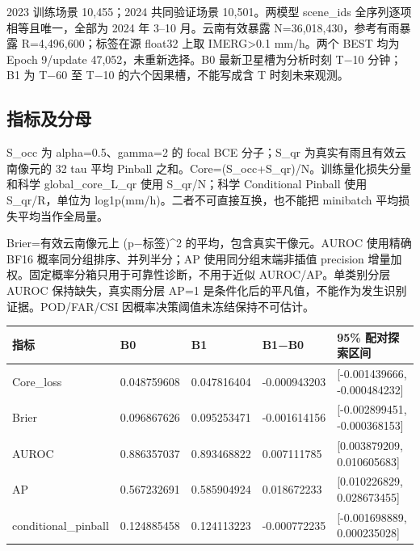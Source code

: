 \documentclass[UTF8,a4paper,10pt,fontset=fandol]{ctexart}
\begin{document}
2023 训练场景 10,455；2024 共同验证场景 10,501。两模型 scene\_\allowbreak{}ids 全序列逐项相等且唯一，全部为 2024 年 3–10 月。云南有效暴露 N=36,018,430，参考有雨暴露 R=4,496,600；标签在源 float32 上取 IMERG>0.1 mm/h。两个 BEST 均为 Epoch 9/update 47,052，未重新选择。B0 最新卫星槽为分析时刻 T−10 分钟；B1 为 T−60 至 T−10 的六个因果槽，不能写成含 T 时刻未来观测。\par

\subsection*{指标及分母}

S\_\allowbreak{}occ 为 alpha=0.5、gamma=2 的 focal BCE 分子；S\_\allowbreak{}qr 为真实有雨且有效云南像元的 32 tau 平均 Pinball 之和。Core=(S\_\allowbreak{}occ+S\_\allowbreak{}qr)/N。训练量化损失分量和科学 global\_\allowbreak{}core\_\allowbreak{}L\_\allowbreak{}qr 使用 S\_\allowbreak{}qr/N；科学 Conditional Pinball 使用 S\_\allowbreak{}qr/R，单位为 log1p(mm/h)。二者不可直接互换，也不能把 minibatch 平均损失平均当作全局量。\par

Brier=有效云南像元上 (p−标签)\textasciicircum{}2 的平均，包含真实干像元。AUROC 使用精确 BF16 概率同分组排序、并列半分；AP 使用同分组末端非插值 precision 增量加权。固定概率分箱只用于可靠性诊断，不用于近似 AUROC/AP。单类别分层 AUROC 保持缺失，真实雨分层 AP=1 是条件化后的平凡值，不能作为发生识别证据。POD/FAR/CSI 因概率决策阈值未冻结保持不可估计。\par

\begin{center}\scriptsize\begin{longtable}{@{}p{\dimexpr(\linewidth-8\tabcolsep)/5\relax}p{\dimexpr(\linewidth-8\tabcolsep)/5\relax}p{\dimexpr(\linewidth-8\tabcolsep)/5\relax}p{\dimexpr(\linewidth-8\tabcolsep)/5\relax}p{\dimexpr(\linewidth-8\tabcolsep)/5\relax}@{}}\toprule
指标 & B0 & B1 & B1−B0 & 95\% 配对探索区间\\
\midrule\endhead
Core\_\allowbreak{}loss & 0.048759608 & 0.047816404 & -0.000943203 & [-0.001439666, -0.000484232]\\
Brier & 0.096867626 & 0.095253471 & -0.001614156 & [-0.002899451, -0.000368153]\\
AUROC & 0.886357037 & 0.893468822 & 0.007111785 & [0.003879209, 0.010605683]\\
AP & 0.567232691 & 0.585904924 & 0.018672233 & [0.010226829, 0.028673455]\\
conditional\_\allowbreak{}pinball & 0.124885458 & 0.124113223 & -0.000772235 & [-0.001698889, 0.000235028]\\
\bottomrule\end{longtable}\end{center}\normalsize
\end{document}

